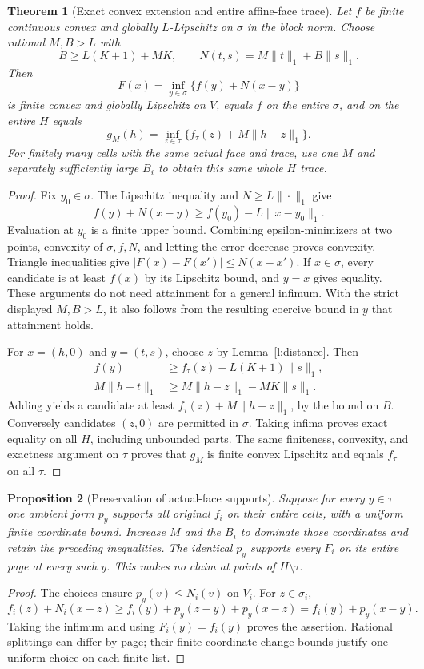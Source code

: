 \documentclass[11pt]{article}
\newtheorem{theorem}{Theorem}[section]
\newtheorem{proposition}[theorem]{Proposition}
\theoremstyle{definition}\newtheorem{definition}[theorem]{Definition}
\theoremstyle{remark}\newtheorem{remark}[theorem]{Remark}
\begin{document}
\begin{theorem}[Exact convex extension and entire affine-face trace]\label{t:trace}
Let $f$ be finite continuous convex and globally $L$-Lipschitz on $\sigma$ in the block norm. Choose rational $M,B>L$ with
\[
 B\geq L(K+1)+MK,
 \qquad N(t,s)=M\|t\|_1+B\|s\|_1.
\]
Then
\[
 F(x)=\inf_{y\in\sigma}\{f(y)+N(x-y)\}
\]
is finite convex and globally Lipschitz on $V$, equals $f$ on the entire $\sigma$, and on the entire $H$ equals
\[
 g_M(h)=\inf_{z\in\tau}\{f_\tau(z)+M\|h-z\|_1\}.
\]
For finitely many cells with the same actual face and trace, use one $M$ and separately sufficiently large $B_i$ to obtain this same whole $H$ trace.
\end{theorem}
\begin{proof}
Fix $y_0\in\sigma$. The Lipschitz inequality and $N\geq L\|\cdot\|_1$ give
\[
 f(y)+N(x-y)\geq f(y_0)-L\|x-y_0\|_1.
\]
Evaluation at $y_0$ is a finite upper bound. Combining epsilon-minimizers at two points, convexity of $\sigma,f,N$, and letting the error decrease proves convexity. Triangle inequalities give $|F(x)-F(x')|\leq N(x-x')$. If $x\in\sigma$, every candidate is at least $f(x)$ by its Lipschitz bound, and $y=x$ gives equality. These arguments do not need attainment for a general infimum. With the strict displayed $M,B>L$, it also follows from the resulting coercive bound in $y$ that attainment holds.

For $x=(h,0)$ and $y=(t,s)$, choose $z$ by Lemma~\ref{l:distance}. Then
\begin{align*}
 f(y)&\geq f_\tau(z)-L(K+1)\|s\|_1,\\
 M\|h-t\|_1&\geq M\|h-z\|_1-MK\|s\|_1.
\end{align*}
Adding yields a candidate at least $f_\tau(z)+M\|h-z\|_1$, by the bound on $B$. Conversely candidates $(z,0)$ are permitted in $\sigma$. Taking infima proves exact equality on all $H$, including unbounded parts. The same finiteness, convexity, and exactness argument on $\tau$ proves that $g_M$ is finite convex Lipschitz and equals $f_\tau$ on all $\tau$.
\end{proof}

\begin{proposition}[Preservation of actual-face supports]\label{p:preserve}
Suppose for every $y\in\tau$ one ambient form $p_y$ supports all original $f_i$ on their entire cells, with a uniform finite coordinate bound. Increase $M$ and the $B_i$ to dominate those coordinates and retain the preceding inequalities. The identical $p_y$ supports every $F_i$ on its entire page at every such $y$. This makes no claim at points of $H\setminus\tau$.
\end{proposition}
\begin{proof}
The choices ensure $p_y(v)\leq N_i(v)$ on $V_i$. For $z\in\sigma_i$,
\[
 f_i(z)+N_i(x-z)\geq f_i(y)+p_y(z-y)+p_y(x-z)
 =f_i(y)+p_y(x-y).
\]
Taking the infimum and using $F_i(y)=f_i(y)$ proves the assertion. Rational splittings can differ by page; their finite coordinate change bounds justify one uniform choice on each finite list.
\end{proof}
\end{document}
